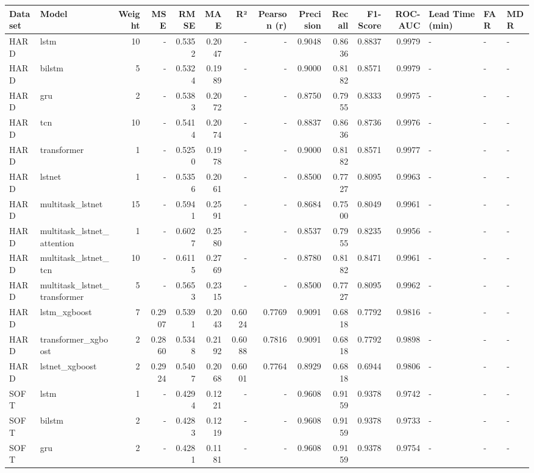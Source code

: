 \begin{tabular}{llrrrrrrrrrrlll}
\toprule
Dataset & Model & Weight & MSE & RMSE & MAE & R² & Pearson (r) & Precision & Recall & F1-Score & ROC-AUC & Lead Time (min) & FAR & MDR \\
\midrule
HARD & lstm & 10 & - & 0.5352 & 0.2047 & - & - & 0.9048 & 0.8636 & 0.8837 & 0.9979 & - & - & - \\
HARD & bilstm & 5 & - & 0.5324 & 0.1989 & - & - & 0.9000 & 0.8182 & 0.8571 & 0.9979 & - & - & - \\
HARD & gru & 2 & - & 0.5383 & 0.2072 & - & - & 0.8750 & 0.7955 & 0.8333 & 0.9975 & - & - & - \\
HARD & tcn & 10 & - & 0.5414 & 0.2074 & - & - & 0.8837 & 0.8636 & 0.8736 & 0.9976 & - & - & - \\
HARD & transformer & 1 & - & 0.5250 & 0.1978 & - & - & 0.9000 & 0.8182 & 0.8571 & 0.9977 & - & - & - \\
HARD & lstnet & 1 & - & 0.5356 & 0.2061 & - & - & 0.8500 & 0.7727 & 0.8095 & 0.9963 & - & - & - \\
HARD & multitask_lstnet & 15 & - & 0.5941 & 0.2591 & - & - & 0.8684 & 0.7500 & 0.8049 & 0.9961 & - & - & - \\
HARD & multitask_lstnet_attention & 1 & - & 0.6027 & 0.2580 & - & - & 0.8537 & 0.7955 & 0.8235 & 0.9956 & - & - & - \\
HARD & multitask_lstnet_tcn & 10 & - & 0.6115 & 0.2769 & - & - & 0.8780 & 0.8182 & 0.8471 & 0.9961 & - & - & - \\
HARD & multitask_lstnet_transformer & 5 & - & 0.5653 & 0.2315 & - & - & 0.8500 & 0.7727 & 0.8095 & 0.9962 & - & - & - \\
HARD & lstm_xgboost & 7 & 0.2907 & 0.5391 & 0.2043 & 0.6024 & 0.7769 & 0.9091 & 0.6818 & 0.7792 & 0.9816 & - & - & - \\
HARD & transformer_xgboost & 2 & 0.2860 & 0.5348 & 0.2192 & 0.6088 & 0.7816 & 0.9091 & 0.6818 & 0.7792 & 0.9898 & - & - & - \\
HARD & lstnet_xgboost & 2 & 0.2924 & 0.5407 & 0.2068 & 0.6001 & 0.7764 & 0.8929 & 0.6818 & 0.6944 & 0.9806 & - & - & - \\
SOFT & lstm & 1 & - & 0.4294 & 0.1221 & - & - & 0.9608 & 0.9159 & 0.9378 & 0.9742 & - & - & - \\
SOFT & bilstm & 2 & - & 0.4283 & 0.1219 & - & - & 0.9608 & 0.9159 & 0.9378 & 0.9733 & - & - & - \\
SOFT & gru & 2 & - & 0.4281 & 0.1181 & - & - & 0.9608 & 0.9159 & 0.9378 & 0.9754 & - & - & - \\

\end{tabular}

